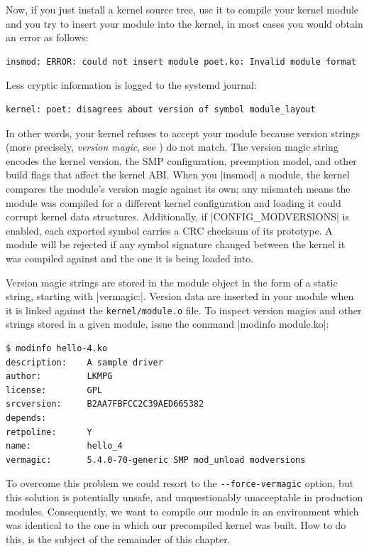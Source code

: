 \documentclass[10pt, oneside]{book}
\begin{document}
Now, if you just install a kernel source tree, use it to compile your kernel module and you try to insert your module into the kernel,
in most cases you would obtain an error as follows:

\begin{verbatim}
insmod: ERROR: could not insert module poet.ko: Invalid module format
\end{verbatim}

Less cryptic information is logged to the systemd journal:

\begin{verbatim}
kernel: poet: disagrees about version of symbol module_layout
\end{verbatim}

In other words, your kernel refuses to accept your module because version strings (more precisely, \textit{version magic}, see ) do not match.
The version magic string encodes the kernel version, the SMP configuration, preemption model, and other build flags that affect the kernel ABI.
When you \sh|insmod| a module, the kernel compares the module's version magic against its own; any mismatch means the module was compiled for a different kernel configuration and loading it could corrupt kernel data structures.
Additionally, if \cpp|CONFIG_MODVERSIONS| is enabled, each exported symbol carries a CRC checksum of its prototype. A module will be rejected if any symbol signature changed between the kernel it was compiled against and the one it is being loaded into.

Version magic strings are stored in the module object in the form of a static string, starting with \cpp|vermagic:|.
Version data are inserted in your module when it is linked against the \verb|kernel/module.o| file.
To inspect version magics and other strings stored in a given module, issue the command \sh|modinfo module.ko|:

\begin{verbatim}
$ modinfo hello-4.ko
description:    A sample driver
author:         LKMPG
license:        GPL
srcversion:     B2AA7FBFCC2C39AED665382
depends:
retpoline:      Y
name:           hello_4
vermagic:       5.4.0-70-generic SMP mod_unload modversions
\end{verbatim}

To overcome this problem we could resort to the \verb|--force-vermagic| option, but this solution is potentially unsafe, and unquestionably unacceptable in production modules.
Consequently, we want to compile our module in an environment which was identical to the one in which our precompiled kernel was built.
How to do this, is the subject of the remainder of this chapter.
\end{document}
